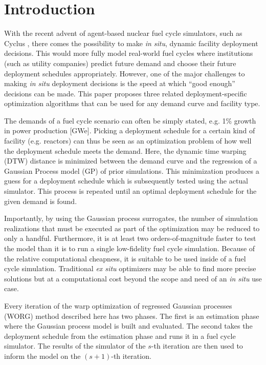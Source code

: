 \section{Introduction}
\label{intro}

With the recent advent of agent-based nuclear fuel cycle simulators, such as 
Cyclus \cite{DBLP:journals/corr/HuffGCFMOSSW15,cyclus_v1_0}, there comes the 
possibility to make \emph{in situ}, dynamic facility deployment decisions.
This  would more fully model real-world fuel cycles where institutions 
(such as utility companies)
predict future demand and choose their future deployment schedules 
appropriately. However, one of the major challenges to making \emph{in situ}
deployment decisions is the speed at which ``good enough'' decisions can 
be made. This paper proposes three related deployment-specific optimization 
algorithms that can be used for any demand curve and facility type.

The demands of a fuel cycle scenario can often be simply stated, e.g. 
1\% growth in power production [GWe]. Picking a deployment schedule for a 
certain kind of facility (e.g. reactors) can thus be seen as an optimization 
problem of how well the deployment schedule meets the demand. Here, the 
dynamic time warping (DTW) \cite{muller} distance is minimized 
between the demand curve and the regression of a Gaussian Process model (GP) 
\cite{rasmussen2006gaussian} of prior simulations. This minimization produces
a guess for a deployment schedule which is subsequently tested using 
the actual simulator. This process is repeated until an optimal deployment
schedule for the given demand is found.

Importantly, by using the Gaussian process surrogates, the number of 
simulation realizations that must be executed as part of the optimization may 
be reduced to only a handful. Furthermore, it is at least two 
orders-of-magnitude faster to test the model than it is to run a single
low-fidelity fuel cycle simulation. Because of the relative computational 
cheapness, it 
is suitable to be used inside of a fuel cycle simulation. Traditional
\emph{ex situ} optimizers may be able to find more precise solutions but at a
computational cost beyond the scope and need of an \emph{in situ} use case.

Every iteration of the warp optimization of regressed Gaussian processes (WORG) 
method described here has two phases. The first is an estimation phase where 
the Gaussian process model is built and evaluated. The second takes the 
deployment schedule from the estimation phase and runs it in a fuel cycle 
simulator. The results of the simulator of the $s$-th iteration are then 
used to inform the model on the $(s+1)$-th iteration. 

